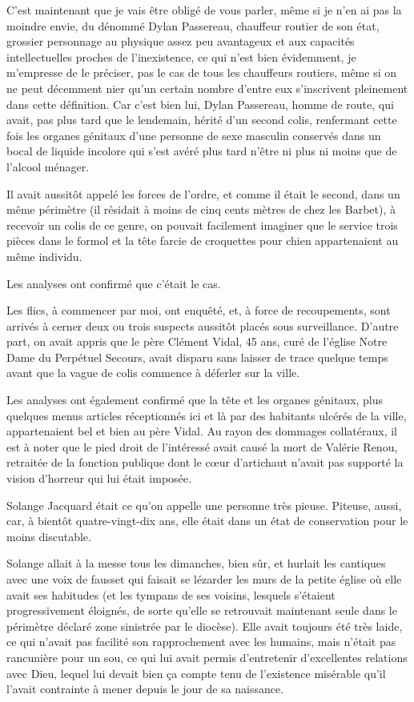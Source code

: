 C’est maintenant que je vais être obligé de vous parler, même si je n’en ai pas la moindre envie, du dénommé Dylan Passereau, chauffeur routier de son état, grossier personnage au physique assez peu avantageux et aux capacités intellectuelles proches de l’inexistence, ce qui n’est bien évidemment, je m’empresse de le préciser, pas le cas de tous les chauffeurs routiers, même si on ne peut décemment nier qu’un certain nombre d’entre eux s’inscrivent pleinement dans cette définition. Car c’est bien lui, Dylan Passereau, homme de route, qui avait, pas plus tard que le lendemain, hérité d’un second colis, renfermant cette fois les organes génitaux d’une personne de sexe masculin conservés dans un bocal de liquide incolore qui s’est avéré plus tard n’être ni plus ni moins que de l’alcool ménager.

Il avait aussitôt appelé les forces de l’ordre, et comme il était le second, dans un même périmètre (il résidait à moins de cinq cents mètres de chez les Barbet), à recevoir un colis de ce genre, on pouvait facilement imaginer que le service trois pièces dans le formol et la tête farcie de croquettes pour chien appartenaient au même individu.

Les analyses ont confirmé que c’était le cas.

Les flics, à commencer par moi, ont enquêté, et, à force de recoupements, sont arrivés à cerner deux ou trois suspects aussitôt placés sous surveillance. D’autre part, on avait appris que le père Clément Vidal, 45 ans, curé de l’église Notre Dame du Perpétuel Secours, avait disparu sans laisser de trace quelque temps avant que la vague de colis commence à déferler sur la ville.

Les analyses ont également confirmé que la tête et les organes génitaux, plus quelques menus articles réceptionnés ici et là par des habitants ulcérés de la ville, appartenaient bel et bien au père Vidal. Au rayon des dommages collatéraux, il est à noter que le pied droit de l’intéressé avait causé la mort de Valérie Renou, retraitée de la fonction publique dont le cœur d’artichaut n’avait pas supporté la vision d’horreur qui lui était imposée.

\ornamentalrule

Solange Jacquard était ce qu’on appelle une personne très pieuse. Piteuse, aussi, car, à bientôt quatre-vingt-dix ans, elle était dans un état de conservation pour le moins discutable.

Solange allait à la messe tous les dimanches, bien sûr, et hurlait les cantiques avec une voix de fausset qui faisait se lézarder les murs de la petite église où elle avait ses habitudes (et les tympans de ses voisins, lesquels s’étaient progressivement éloignés, de sorte qu’elle se retrouvait maintenant seule dans le périmètre déclaré zone sinistrée par le diocèse). Elle avait toujours été très laide, ce qui n’avait pas facilité son rapprochement avec les humains, mais n’était pas rancunière pour un sou, ce qui lui avait permis d’entretenir d’excellentes relations avec Dieu, lequel lui devait bien ça compte tenu de l’existence misérable qu’il l’avait contrainte à mener depuis le jour de sa naissance.

